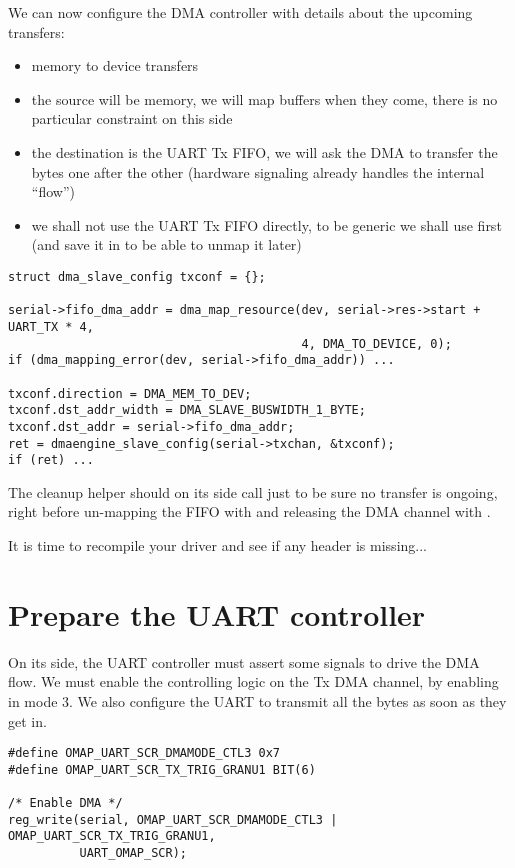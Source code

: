 We can now configure the DMA controller with details about the upcoming
transfers:
\begin{itemize}
\item memory to device transfers
\item the source will be memory, we will map buffers when they come,
  there is no particular constraint on this side
\item the destination is the UART Tx FIFO, we will ask the DMA to
  transfer the bytes one after the other (hardware signaling already
  handles the internal ``flow'')
\item we shall not use the UART Tx FIFO directly, to be generic we shall use
   first (and save it in  to be able
  to unmap it later)
\end{itemize}

\begin{verbatim}
struct dma_slave_config txconf = {};

serial->fifo_dma_addr = dma_map_resource(dev, serial->res->start + UART_TX * 4,
                                         4, DMA_TO_DEVICE, 0);
if (dma_mapping_error(dev, serial->fifo_dma_addr)) ...

txconf.direction = DMA_MEM_TO_DEV;
txconf.dst_addr_width = DMA_SLAVE_BUSWIDTH_1_BYTE;
txconf.dst_addr = serial->fifo_dma_addr;
ret = dmaengine_slave_config(serial->txchan, &txconf);
if (ret) ...
\end{verbatim}

The cleanup helper should on its side call
 just to be sure no transfer is
ongoing, right before un-mapping the FIFO with  and
releasing the DMA channel with .

It is time to recompile your driver and see if any header is missing...

\section{Prepare the UART controller}

On its side, the UART controller must assert some signals to drive the DMA
flow. We must enable the controlling logic on the Tx DMA channel, by enabling
 in mode 3. We also configure the UART to transmit all the bytes
as soon as they get in.

\begin{verbatim}
#define OMAP_UART_SCR_DMAMODE_CTL3 0x7
#define OMAP_UART_SCR_TX_TRIG_GRANU1 BIT(6)

/* Enable DMA */
reg_write(serial, OMAP_UART_SCR_DMAMODE_CTL3 | OMAP_UART_SCR_TX_TRIG_GRANU1,
          UART_OMAP_SCR);
\end{verbatim}

